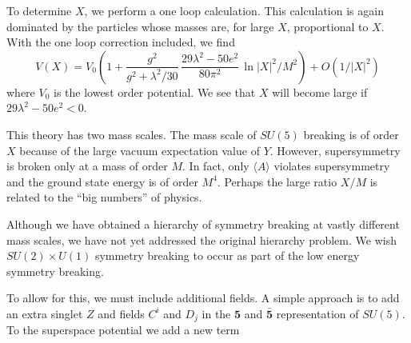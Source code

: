 To determine $X$, we perform a one loop calculation. This calculation
is again dominated by the particles whose masses are, for
large $X$, proportional to $X$. With the one loop correction included,
we find
\begin{equation}
V(X) = V_0 \left(1 + \frac{g^2}{g^2 + \lambda^2/30}\,\frac{29\lambda^2 - 50e^2}{80\pi^2}\,\ln |X|^2/M^2\right) + O(1/|X|^2)
\tag{52}
\end{equation}
where $V_0$ is the lowest order potential. We see that $X$ will become
large if $29\lambda^2 - 50e^2 < 0$.

This theory has two mass scales. The mass scale of $SU(5)$ breaking
is of order $X$ because of the large vacuum expectation value of $Y$.
However, supersymmetry is broken only at a mass of order $M$. In fact,
only $\langle A\rangle$ violates supersymmetry and the ground state energy is of
order $M^4$. Perhaps the large ratio $X/M$ is related to the ``big numbers''
of physics.

Although we have obtained a hierarchy of symmetry breaking at
vastly different mass scales, we have not yet addressed the original
hierarchy problem. We wish $SU(2) \times U(1)$ symmetry breaking to occur
as part of the low energy symmetry breaking.

To allow for this, we must include additional fields. A simple
approach is to add an extra singlet $Z$ and fields $C^i$ and $D_j$ in the $\mathbf{5}$
and $\bar{\mathbf{5}}$ representation of $SU(5)$. To the superspace potential we add
a new term
